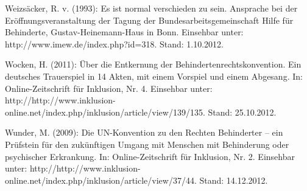 Weizsäcker, R. v. (1993): Es ist normal verschieden zu sein. Ansprache bei der Eröffnungsveranstaltung der Tagung der Bundesarbeitsgemeinschaft Hilfe für Behinderte, Gustav-Heinemann-Haus in Bonn. Einsehbar unter: http://www.imew.de/index.php?id=318. Stand: 1.10.2012.


Wocken, H. (2011): Über die Entkernung der Behindertenrechtskonvention.
Ein deutsches Trauerspiel in 14 Akten, mit einem Vorspiel und einem Abgesang. In: Online-Zeitschrift für Inklusion, Nr. 4. Einsehbar unter: http://http://www.inklusion-online.net/index.php/inklusion/article/view/139/135. Stand: 25.10.2012. 

Wunder, M. (2009): Die UN-Konvention zu den Rechten Behinderter – ein Prüfstein für den zukünftigen Umgang mit Menschen mit Behinderung oder psychischer Erkrankung. In: Online-Zeitschrift für Inklusion, Nr. 2. Einsehbar unter: http://http://www.inklusion-online.net/index.php/inklusion/article/view/37/44. Stand: 14.12.2012.  
